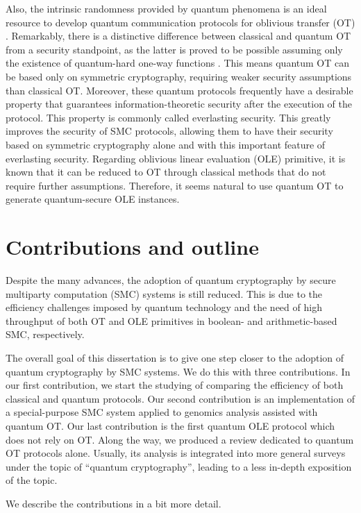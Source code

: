 Also, the intrinsic randomness provided by quantum phenomena is an ideal resource to develop quantum communication protocols for oblivious transfer (OT) \cite{BBCS92}. Remarkably, there is a distinctive difference between classical and quantum OT from a security standpoint, as the latter is proved to be possible assuming only the existence of quantum-hard one-way functions \cite{GLSV21, BCKM21}. This means quantum OT can be based only on symmetric cryptography, requiring weaker security assumptions than classical OT. Moreover, these quantum protocols frequently have a desirable property that guarantees information-theoretic security after the execution of the protocol. This property is commonly called everlasting security. This greatly improves the security of SMC protocols, allowing them to have their security based on symmetric cryptography alone and with this important feature of everlasting security. Regarding oblivious linear evaluation (OLE) primitive, it is known that it can be reduced to OT \cite{KOS16} through classical methods that do not require further assumptions. Therefore, it seems natural to use quantum OT to generate quantum-secure OLE instances.


\section*{Contributions and outline} %

Despite the many advances, the adoption of quantum cryptography by secure multiparty computation (SMC) systems is still reduced. This is due to the efficiency challenges imposed by quantum technology and the need of high throughput of both OT and OLE primitives in boolean- and arithmetic-based SMC, respectively.

The overall goal of this dissertation is to give one step closer to the adoption of quantum cryptography by SMC systems. We do this with three contributions. In our first contribution, we start the studying of comparing the efficiency of both classical and quantum protocols. Our second contribution is an implementation of a special-purpose SMC system applied to genomics analysis assisted with quantum OT. Our last contribution is the first quantum OLE protocol which does not rely on OT. Along the way, we produced a review dedicated to quantum OT protocols alone. Usually, its analysis is integrated into more general surveys under the topic of “quantum cryptography”, leading to a less in-depth exposition of the topic.

We describe the contributions in a bit more detail.

